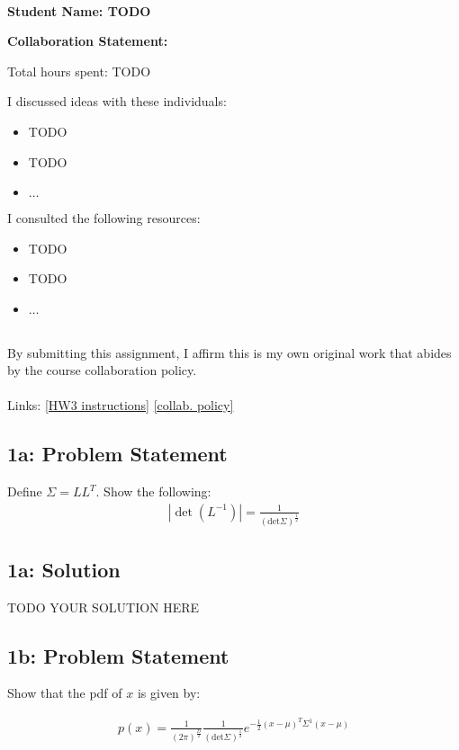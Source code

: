 \documentclass[10pt]{article}
\newcommand{\officialdirections}[1]{{\color{purple} #1}}
\begin{document}
~~\\ %

{\Large{\bf Student Name: TODO}}

\Large{\bf Collaboration Statement:}

Total hours spent: TODO

I discussed ideas with these individuals:
\begin{itemize}
\item TODO
\item TODO
\item $\ldots$	
\end{itemize}

I consulted the following resources:
\begin{itemize}
\item TODO
\item TODO
\item $\ldots$	
\end{itemize}
~~\\
By submitting this assignment, I affirm this is my own original work that abides by the course collaboration policy.
~~\\
~~\\
Links: 
\href{https://www.cs.tufts.edu/cs/136/2023s/hw3.html}{[HW3 instructions]} 
\href{https://www.cs.tufts.edu/cs/136/2023s/index.html#collaboration}{[collab. policy]} 

\tableofcontents

\newpage

\officialdirections{
\subsection*{1a: Problem Statement}
Define $\Sigma = L L^T$. Show the following:
\begin{align}
| \det (L^{-1}) | = \frac{1}{(\text{det} \Sigma)^{\frac{1}{2}}}
\end{align}
}

\subsection{1a: Solution}
TODO YOUR SOLUTION HERE


\officialdirections{
\subsection*{1b: Problem Statement}
Show that the pdf of $x$ is given by:

\begin{align}
p(x) = \frac{1}{(2\pi)^{\frac{D}{2}}}
\frac{1}{(\text{det} \Sigma)^{\frac{1}{2}}}
e^{-\frac{1}{2} (x-\mu)^T \Sigma^{1} (x-\mu)}
\end{align}
}
\end{document}

